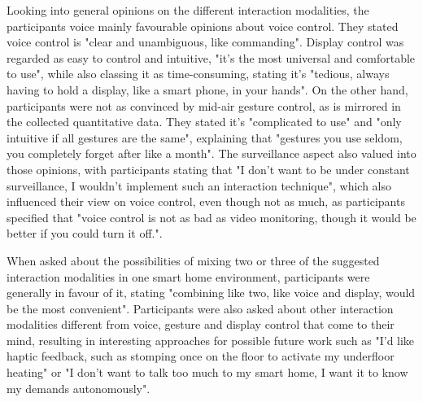 \documentclass[sigchi]{acmart}
\begin{document}
	Looking into general opinions on the different interaction modalities, the participants voice mainly favourable opinions about voice control. They stated voice control is "clear and unambiguous, like commanding". Display control was regarded as easy to control and intuitive, "it's the most universal and comfortable to use", while also classing it as time-consuming, stating it's "tedious, always having to hold a display, like a smart phone, in your hands". On the other hand, participants were not as convinced by mid-air gesture control, as is mirrored in the collected quantitative data. They stated it's "complicated to use" and "only intuitive if all gestures are the same", explaining that "gestures you use seldom, you completely forget after like a month". The surveillance aspect also valued into those opinions, with participants stating that "I don't want to be under constant surveillance, I wouldn't implement such an interaction technique", which also influenced their view on voice control, even though not as much, as participants specified that "voice control is not as bad as video monitoring, though it would be better if you could turn it off.". 
	
	When asked about the possibilities of mixing two or three of the suggested interaction modalities in one smart home environment, participants were generally in favour of it, stating "combining like two, like voice and display, would be the most convenient". Participants were also asked about other interaction modalities different from voice, gesture and display control that come to their mind, resulting in interesting approaches for possible future work such as "I'd like haptic feedback, such as stomping once on the floor to activate my underfloor heating" or "I don't want to talk too much to my smart home, I want it to know my demands autonomously". 
	
\end{document}
